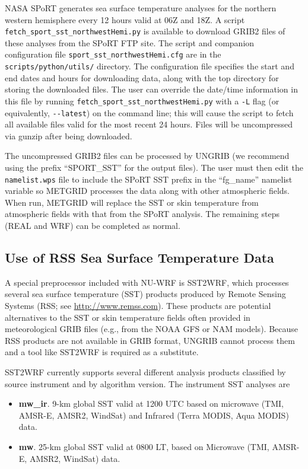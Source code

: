 NASA SPoRT generates sea surface temperature analyses for the northern 
western hemisphere every 12 hours valid at 06Z and 18Z.  A script\\
\texttt{fetch\_sport\_sst\_northwestHemi.py} is available to download
GRIB2 files of these analyses from the SPoRT FTP site.  The script and
companion configuration file \texttt{sport\_sst\_northwestHemi.cfg} are in the 
\texttt{scripts/python/utils/} directory.  The configuration file specifies the
start and end dates and hours for downloading data, along with the top 
directory for storing the downloaded files.  The user can override the 
date/time information in this file by running 
\texttt{fetch\_sport\_sst\_northwestHemi.py} with a \texttt{-L} flag (or 
equivalently, \texttt{-{}-latest}) on the command line; this will cause the 
script to fetch all available files valid for the most recent 24 hours.  Files
will be uncompressed via gunzip after being downloaded.

The uncompressed GRIB2 files can be processed by UNGRIB (we recommend using 
the prefix ``SPORT\_SST'' for the output files).  The user must then edit the 
\texttt{namelist.wps} file to include the SPoRT SST prefix in the 
``fg\_name'' namelist variable so METGRID processes the data along with other 
atmospheric fields. When run, METGRID will replace the SST or skin temperature
from atmospheric fields with that from the SPoRT analysis.  The remaining 
steps (REAL and WRF) can be completed as normal.
 
\subsection{Use of RSS Sea Surface Temperature Data}
\label{subsec:RSSSST}

A special preprocessor included with NU-WRF is SST2WRF, which processes
several sea surface temperature (SST) products produced by Remote Sensing
Systems (RSS; see \url{http://www.remss.com}). These products are potential 
alternatives to the SST or skin temperature fields often provided in 
meteorological GRIB files (e.g., from the NOAA GFS or NAM models). Because 
RSS products are not available in GRIB format, UNGRIB cannot process them
and a tool like SST2WRF is required as a substitute.

SST2WRF currently supports several different analysis products classified by 
source instrument and by algorithm version. The instrument SST analyses are
\begin{itemize}
\item \textbf{mw\_ir}. 9-km global SST valid at 1200 UTC based on microwave 
  (TMI, AMSR-E, AMSR2, WindSat) and Infrared (Terra MODIS, Aqua MODIS) data.
\item \textbf{mw}. 25-km global SST valid at 0800 LT, based on Microwave (TMI,
  AMSR-E, AMSR2, WindSat) data.
\end{itemize}

